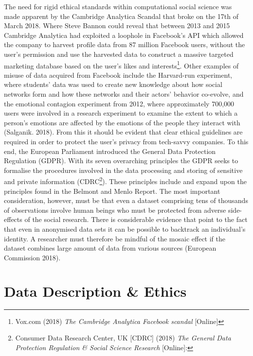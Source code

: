 \documentclass[12pt,a4paper]{article}
\begin{document}
The need for rigid ethical standards within computational social science was made apparent by the Cambridge Analytica Scandal that broke on the 17th of March 2018. Where Steve Bannon could reveal that between 2013 and 2015 Cambridge Analytica had exploited a loophole in Facebook’s API which allowed the company to harvest profile data from 87 million Facebook users, without the user’s permission and use the harvested data to construct a massive targeted marketing database based on the user’s likes and interests\footnote{Vox.com (2018) \textit{The Cambridge Analytica Facebook scandal} [Online]}. Other examples of misuse of data acquired from Facebook include the Harvard-run experiment, where students' data was used to create new knowledge about how social networks form and how these networks and their actors' behavior co-evolve, and the emotional contagion experiment from 2012, where approximately 700,000 users were involved in a research experiment to examine the extent to which a person's emotions are affected by the emotions of the people they interact with (Salganik. 2018).\newline
From this it should be evident that clear ethical guidelines are required in order to protect the user's privacy from tech-savvy companies. To this end, the European Parliament introduced the General Data Protection Regulation (GDPR). With its seven overarching principles the GDPR seeks to formalise the procedures involved in the data processing and storing of sensitive and private information (CDRC\footnote{Consumer Data Research Center, UK  [CDRC] (2018) \textit{The General Data Protection Regulation \& Social Science Research} [Online]:}). These principles include and expand upon the principles found in the Belmont and Menlo Report. The most important consideration, however, must be that even a dataset comprising tens of thousands of observations involve human beings who must be protected from adverse side-effects of the social research. There is considerable evidence that point to the fact that even in anonymised data sets it can be possible to backtrack an individual's identity. A researcher must therefore be mindful of the mosaic effect if the dataset combines large amount of data from various sources (European Commission 2018).

\section{Data Description \& Ethics}
\end{document}
